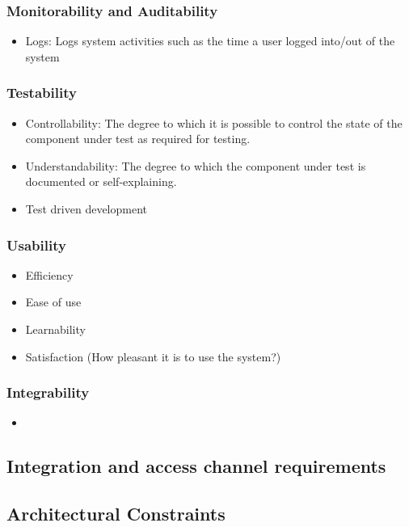 \documentclass[12pt, oneside]{article}
\begin{document}
		\subsubsection{Monitorability and Auditability}
			\begin{itemize}
				\item Logs: Logs system activities such as the time a user logged into/out of the system
			\end{itemize}
		\subsubsection{Testability}
			\begin{itemize}
				\item Controllability: The degree to which it is possible to control the state of the component under test as required for testing.
				\item Understandability: The degree to which the component under test is documented or self-explaining.
				\item Test driven development
			\end{itemize}
		\subsubsection{Usability}
			\begin{itemize}
				\item Efficiency
				\item Ease of use
				\item Learnability
				\item Satisfaction (How pleasant it is to use the system?)
			\end{itemize}
		\subsubsection{Integrability}
				\begin{itemize}
					\item 
				\end{itemize}
				
	\subsection{Integration and access channel requirements}
	\subsection{Architectural Constraints}		
\end{document}
